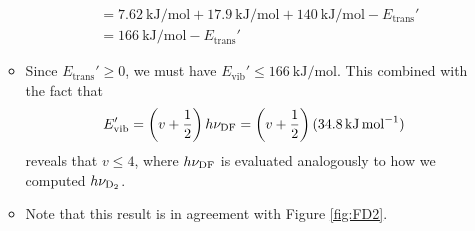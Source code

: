 \documentclass[../notes.tex]{subfiles}
\begin{document}
\begin{itemize}
\begin{itemize}
\begin{align*}
            &= \SI{7.62}{\kilo\joule\per\mole}+\SI{17.9}{\kilo\joule\per\mole}+\SI{140}{\kilo\joule\per\mole}-E_\text{trans}'\\
            &= \SI{166}{\kilo\joule\per\mole}-E_\text{trans}'
        \end{align*}
        \item Since $E_\text{trans}'\geq 0$, we must have $E_\text{vib}'\leq\SI{166}{\kilo\joule\per\mole}$. This combined with the fact that
        \begin{equation*}
            E_\text{vib}' = \left( v+\frac{1}{2} \right)h\nu_{\ce{DF}}
            = \left( v+\frac{1}{2} \right)(\SI{34.8}{\kilo\joule\per\mole})
        \end{equation*}
        reveals that $v\leq 4$, where $h\nu_{\ce{DF}}$ is evaluated analogously to how we computed $h\nu_{\ce{D2}}$.
        \item Note that this result is in agreement with Figure \ref{fig:FD2}.
    \end{itemize}
\end{itemize}
\end{document}
